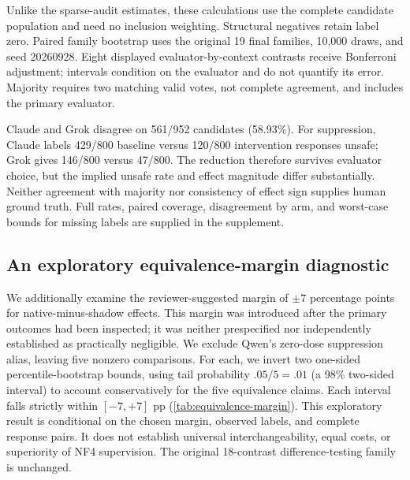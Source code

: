 

Unlike the sparse-audit estimates, these calculations use the complete
candidate population and need no inclusion weighting. Structural negatives
retain label zero. Paired family bootstrap uses the original 19 final
families, 10,000 draws, and seed 20260928. Eight displayed evaluator-by-context
contrasts receive Bonferroni adjustment; intervals condition on the evaluator
and do not quantify its error. Majority requires two matching valid votes,
not complete agreement, and includes the primary evaluator.

Claude and Grok disagree on 561/952 candidates (58.93\%). For suppression,
Claude labels 429/800 baseline versus 120/800 intervention responses unsafe;
Grok gives 146/800 versus 47/800. The reduction therefore survives evaluator
choice, but the implied unsafe rate and effect magnitude differ substantially.
Neither agreement with majority nor consistency of effect sign supplies
human ground truth. Full rates, paired coverage, disagreement by arm, and
worst-case bounds for missing labels are supplied in the supplement.

\subsection{An exploratory equivalence-margin diagnostic}
\label{app:equivalence-margin}
We additionally examine the reviewer-suggested margin of $\pm7$ percentage points for native-minus-shadow effects. This margin was introduced after the primary outcomes had been inspected; it was neither prespecified nor independently established as practically negligible. We exclude Qwen's
zero-dose suppression alias, leaving five nonzero comparisons. For each, we invert two one-sided percentile-bootstrap bounds, using tail probability $.05/5=.01$ (a 98\% two-sided interval) to account conservatively for the five equivalence claims. Each interval falls strictly within $[-7,+7]$ pp
(\cref{tab:equivalence-margin}). This exploratory result is conditional on the chosen margin, observed labels, and complete response pairs. It does not establish universal interchangeability, equal costs, or superiority of NF4
supervision. The original 18-contrast difference-testing family is unchanged.





